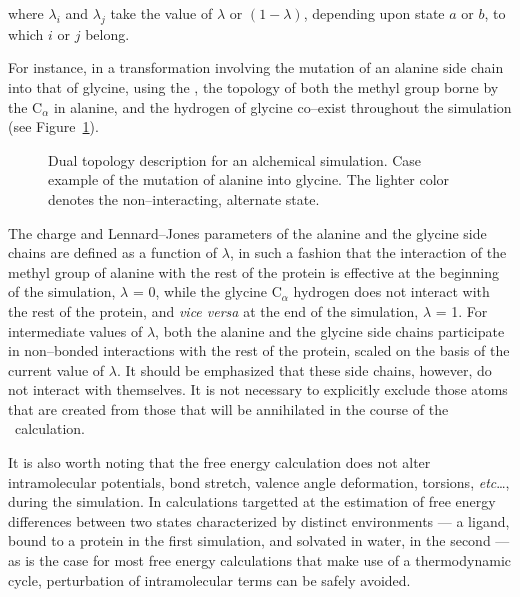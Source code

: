 where $\lambda_i$ and $\lambda_j$ take the value of $\lambda$ or $(1-\lambda)$,
depending upon state $a$ or $b$, to which $i$ or $j$ belong.


For instance, in a transformation involving the mutation of an
alanine side chain into that of glycine, using the \FEP, the topology
of both the methyl group borne by the C$_\alpha$ in alanine,
and the hydrogen of glycine co--exist throughout the simulation
(see Figure~\ref{fig:dual_top}).


\begin{figure}[ht]
  \caption{Dual topology description for an alchemical simulation.
         Case example of the mutation of alanine into glycine.
         The lighter color denotes the non--interacting, alternate
         state.}
  \label{fig:dual_top}
\end{figure}


The charge and Lennard--Jones parameters of the alanine and
the glycine side chains
are defined as a function of $\lambda$, in such a fashion that 
the interaction of the methyl group of alanine with the rest of 
the protein is effective at the beginning of the simulation,
\ie $\lambda$ = 0, while
the glycine C$_\alpha$ hydrogen does not interact with the rest
of the protein, and {\it vice versa} at the end of the
simulation, \ie $\lambda$ = 1.
For intermediate values of $\lambda$, both the alanine and the glycine
side chains participate in non--bonded interactions with the rest 
of the protein, scaled on the basis of the current value of $\lambda$.
It should be emphasized that these side chains, however,
do not interact with themselves.
It is not necessary to explicitly exclude those atoms that are created
from those that will be annihilated in the course of the
\FEP\ calculation.


It is also worth noting that
the free energy calculation does not alter intramolecular
potentials, \ie bond stretch, valence angle deformation, torsions,
{\it etc}\dots, during
the simulation. In calculations targetted at the estimation
of free energy differences between two states characterized by
distinct environments --- \eg a ligand, bound to a protein in
the first simulation,
and solvated in water, in the second --- as is the 
case for most free energy calculations that make use of a thermodynamic 
cycle, perturbation of intramolecular terms can be safely
avoided.~\cite{Boresch.99a}


